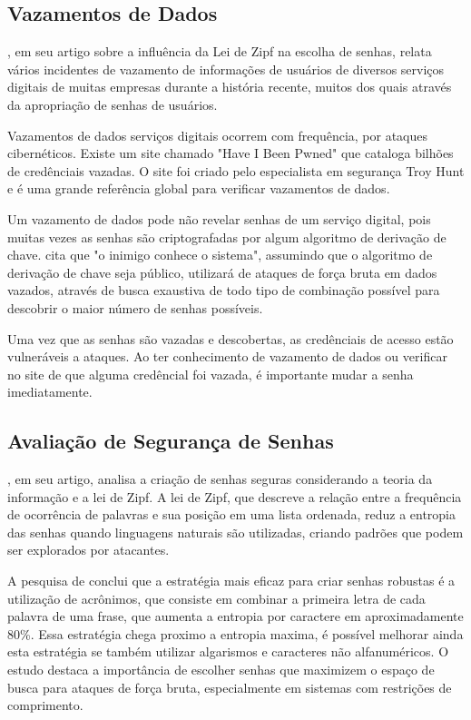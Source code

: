 \documentclass[12pt]{article}
\begin{document}
\subsection{Vazamentos de Dados}

\cite{article:1}, em seu artigo sobre a influência da Lei de Zipf na
escolha de senhas, relata vários incidentes de vazamento de informações de
usuários de diversos serviços digitais de muitas empresas durante a história
recente, muitos dos quais através da apropriação de senhas de usuários.

Vazamentos de dados serviços digitais ocorrem com frequência, por ataques
cibernéticos.
Existe um site chamado "Have I Been Pwned" \cite{hibp} que cataloga bilhões de
credênciais vazadas.
O site foi criado pelo especialista em segurança Troy Hunt e é uma grande
referência global para verificar vazamentos de dados.

Um vazamento de dados pode não revelar senhas de um serviço digital, pois muitas
vezes as senhas são criptografadas por algum algoritmo de derivação de chave.
\cite{article:1} cita que "o inimigo conhece o sistema", assumindo que o algoritmo
de derivação de chave seja público, utilizará de ataques de força bruta em dados
vazados, através de busca exaustiva de todo tipo de combinação possível para
descobrir o maior número de senhas possíveis.

Uma vez que as senhas são vazadas e descobertas, as credênciais de acesso estão
vulneráveis a ataques.
Ao ter conhecimento de vazamento de dados ou verificar no site de \cite{hibp} que
alguma credêncial foi vazada, é importante mudar a senha imediatamente.

\subsection{Avaliação de Segurança de Senhas}

\cite{article:1}, em seu artigo, analisa a criação de senhas seguras considerando
a teoria da informação e a lei de Zipf.
A lei de Zipf, que descreve a relação entre a frequência de ocorrência de
palavras e sua posição em uma lista ordenada, reduz a entropia das senhas
quando linguagens naturais são utilizadas, criando padrões que podem ser
explorados por atacantes.

A pesquisa de \cite{article:1} conclui que a estratégia mais eficaz para criar senhas
robustas é a utilização de acrônimos, que consiste em combinar a primeira letra de
cada palavra de uma frase, que aumenta a entropia por caractere em aproximadamente 80\%.
Essa estratégia chega proximo a entropia maxima, é possível melhorar ainda esta
estratégia se também utilizar algarismos e caracteres não alfanuméricos.
O estudo destaca a importância de escolher senhas que maximizem o espaço
de busca para ataques de força bruta, especialmente em sistemas com
restrições de comprimento.
\end{document}
